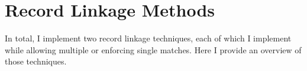 \documentclass[12pt]{article}
\begin{document}



\section{Record Linkage Methods}
In total, I implement two record linkage techniques, each of which I implement while allowing multiple or enforcing single matches.  Here I provide an overview of those techniques. 
\end{document}
